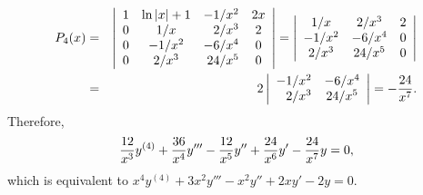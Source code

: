 \documentclass[dvips]{book}
\numberwithin{example}{section}
\numberwithin{equation}{section}
\numberwithin{theorem}{section}
\numberwithin{table}{section}
\numberwithin{figure}{section}
\begin{document}
\begin{eqnarray*}
P_4(x)&=&
\left|\begin{array}{ccrc}
1&\ln|x|+1&-1/x^2&2x\\
0&1/x&2/x^3&2\\
0&-1/x^2&-6/x^4&0\\
0&2/x^3&24/x^5&0
\end{array}\right|=
\left|\begin{array}{ccrc}
1/x&2/x^3&2\\
-1/x^2&-6/x^4&0\\
2/x^3&24/x^5&0
\end{array}\right|\\
&=&2\left|\begin{array}{rc}
-1/x^2&-6/x^4\\
2/x^3&24/x^5
\end{array}\right|=-{24\over x^7}.
\end{eqnarray*}
Therefore,
$$
{12\over x^3}y^{(4)}+{36\over x^4}y'''-{12\over x^5}y''+{24\over
x^6}y'-{24\over x^7}y=0,
$$
which is equivalent to
 $x^4y^{(4)}+3x^2y'''-x^2y''+2xy'-2y=0$.
\end{document}
